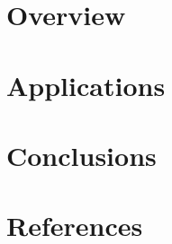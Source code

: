 \section[Overview]{Overview}


\section[Apps]{Applications}


\section[Concl]{Conclusions}


\section[Refs]{References}
